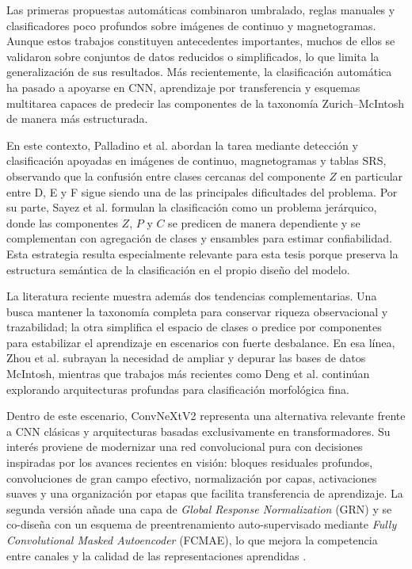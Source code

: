 Las primeras propuestas automáticas combinaron umbralado, reglas manuales y clasificadores poco profundos sobre imágenes de continuo y magnetogramas. Aunque estos trabajos constituyen antecedentes importantes, muchos de ellos se validaron sobre conjuntos de datos reducidos o simplificados, lo que limita la generalización de sus resultados. Más recientemente, la clasificación automática ha pasado a apoyarse en CNN, aprendizaje por transferencia y esquemas multitarea capaces de predecir las componentes de la taxonomía Zurich--McIntosh de manera más estructurada.

En este contexto, Palladino et al. \citep{palladino2022sunspot} abordan la tarea mediante detección y clasificación apoyadas en imágenes de continuo, magnetogramas y tablas SRS, observando que la confusión entre clases cercanas del componente $Z$ en particular entre D, E y F sigue siendo una de las principales dificultades del problema. Por su parte, Sayez et al. \citep{sayez2023sunscc} formulan la clasificación como un problema jerárquico, donde las componentes $Z$, $P$ y $C$ se predicen de manera dependiente y se complementan con agregación de clases y ensambles para estimar confiabilidad. Esta estrategia resulta especialmente relevante para esta tesis porque preserva la estructura semántica de la clasificación en el propio diseño del modelo.

La literatura reciente muestra además dos tendencias complementarias. Una busca mantener la taxonomía completa para conservar riqueza observacional y trazabilidad; la otra simplifica el espacio de clases o predice por componentes para estabilizar el aprendizaje en escenarios con fuerte desbalance. En esa línea, Zhou et al. \citep{zhou2023mcintosh} subrayan la necesidad de ampliar y depurar las bases de datos McIntosh, mientras que trabajos más recientes como Deng et al. \citep{deng2025mcintosh} continúan explorando arquitecturas profundas para clasificación morfológica fina.

Dentro de este escenario, ConvNeXtV2 representa una alternativa relevante frente a CNN clásicas y arquitecturas basadas exclusivamente en transformadores. Su interés proviene de modernizar una red convolucional pura con decisiones inspiradas por los avances recientes en visión: bloques residuales profundos, convoluciones de gran campo efectivo, normalización por capas, activaciones suaves y una organización por etapas que facilita transferencia de aprendizaje. La segunda versión añade una capa de \textit{Global Response Normalization} (GRN) y se co-diseña con un esquema de preentrenamiento auto-supervisado mediante \textit{Fully Convolutional Masked Autoencoder} (FCMAE), lo que mejora la competencia entre canales y la calidad de las representaciones aprendidas \citep{woo2023convnextv2}.


